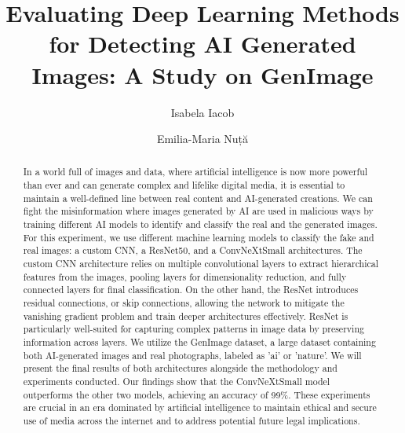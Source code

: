 \documentclass[runningheads]{llncs}
\begin{document}
%
\title{Evaluating Deep Learning Methods for Detecting AI Generated Images: A Study on GenImage}
%
%
\author{Isabela Iacob \and Emilia-Maria Nuță}
%
%
%
\maketitle              %
%
\begin{abstract}

In a world full of images and data, where artificial intelligence is now more powerful than ever and can generate complex and lifelike digital media, it is essential to maintain a well-defined line between real content and AI-generated creations. We can fight the misinformation where images generated by AI are used in malicious ways by training different AI models to identify and classify the real and the generated images. For this experiment, we use different machine learning models to classify the fake and real images: a custom CNN, a ResNet50, and a ConvNeXtSmall architectures.
The custom CNN architecture relies on multiple convolutional layers to extract hierarchical features from the images, pooling layers for dimensionality reduction, and fully connected layers for final classification. On the other hand, the ResNet introduces residual connections, or skip connections, allowing the network to mitigate the vanishing gradient problem and train deeper architectures effectively. ResNet is particularly well-suited for capturing complex patterns in image data by preserving information across layers.
We utilize the GenImage dataset, a large dataset containing both AI-generated images and real photographs, labeled as 'ai' or 'nature'.  We will present the final results of both architectures alongside the methodology and experiments conducted. Our findings show that the ConvNeXtSmall model outperforms the other two models, achieving an accuracy of 99\%.
These experiments are crucial in an era dominated by artificial intelligence to maintain ethical and secure use of media across the internet and to address potential future legal implications.

\end{abstract}
%
%
\end{document}

